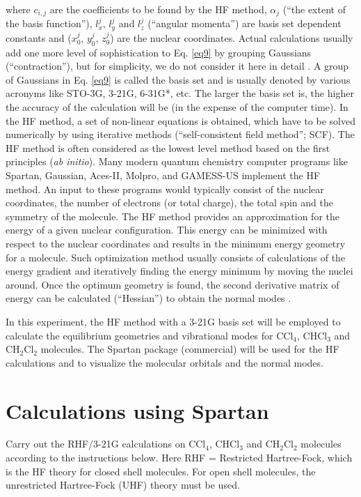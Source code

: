 \documentclass[byrevtex,amssymb,aps,pra,floatfix,letterpaper]{revtex4}
\begin{document}
\noindent
where $c_{i,j}$ are the coefficients to be found by the HF method, $\alpha_j$ (``the extent of the basis function''), $l_x^j$, $l_y^j$ and $l_z^j$  (``angular momenta'') are basis set dependent constants and ($x_0^j$, $y_0^j$, $z_0^j$) are the nuclear coordinates. Actual calculations usually add one more level of sophistication to Eq. \ref{eq9} by grouping Gaussians (``contraction''), but for simplicity, we do not consider it here in detail \cite{ATKINS2}. A group of Gaussians in Eq. \ref{eq9} is called the basis set and is usually denoted by various acronyms like STO-3G, 3-21G, 6-31G*, etc. The larger the basis set is, the higher the accuracy of the calculation will be (in the expense of the computer time). In the HF method, a set of non-linear equations is obtained, which have to be solved numerically by using iterative methods (``self-consistent field method''; SCF). The HF method is often considered as the lowest level method based on the first principles (\textit{ab initio}). Many modern quantum chemistry computer programs like Spartan, Gaussian, Aces-II, Molpro, and GAMESS-US implement the HF method. An input to these programs would typically consist of the nuclear coordinates, the number of electrons (or total charge), the total spin and the symmetry of the molecule. The HF method provides an approximation for the energy of a given nuclear configuration. This energy can be minimized with respect to the nuclear coordinates and results in the minimum energy geometry for a molecule. Such optimization method usually consists of calculations of the energy gradient and iteratively finding the energy minimum by moving the nuclei around. Once the optimum geometry is found, the second derivative matrix of energy can be calculated (``Hessian'') to obtain the normal modes \cite{ATKINS2}.

In this experiment, the HF method with a 3-21G basis set will be employed to calculate the equilibrium geometries and vibrational modes for CCl$_4$, CHCl$_3$ and CH$_2$Cl$_2$ molecules. The Spartan package (commercial) will be used for the HF calculations and to visualize the molecular orbitals and the normal modes.

\section{Calculations using Spartan}

Carry out the RHF/3-21G calculations on CCl$_4$, CHCl$_3$ and CH$_2$Cl$_2$ molecules according to the instructions below. Here RHF = Restricted Hartree-Fock, which is the HF theory for closed shell molecules. For open shell molecules, the unrestricted Hartree-Fock (UHF) theory must be used.
\end{document}
